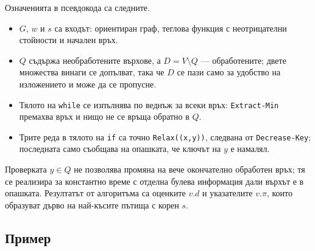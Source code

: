 Означенията в псевдокода са следните.

\begin{itemize}
\item $G$, $w$ и $s$ са входът: ориентиран граф, теглова функция с неотрицателни стойности и начален връх.
\item $Q$ съдържа необработените върхове, а $D=V\setminus Q$ --- обработените; двете множества винаги се допълват, така че $D$ се пази само за удобство на изложението и може да се пропусне.
\item Тялото на \verb|while| се изпълнява по веднъж за всеки връх: \verb|Extract-Min| премахва връх и нищо не се връща обратно в $Q$.
\item Трите реда в тялото на \verb|if| са точно \verb|Relax((x,y))|, следвана от \verb|Decrease-Key|; последната само съобщава на опашката, че ключът на $y$ е намалял.
\end{itemize}

Проверката $y\in Q$ не позволява промяна на вече окончателно обработен връх; тя се реализира за константно време с отделна булева информация дали върхът е в опашката. Резултатът от алгоритъма са оценките $v.d$ и указателите $v.\pi$, които образуват дърво на най-късите пътища с корен $s$.

\subsection{Пример}\label{s:8.3.4}


